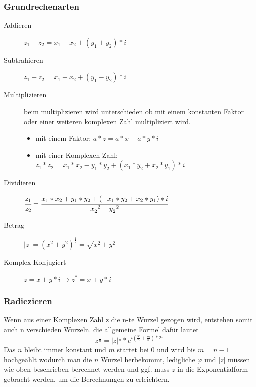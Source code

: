 \documentclass[a4paper]{scrartcl}
\begin{document}
            \subsubsection{Grundrechenarten}
                \begin{description}
                    \item[Addieren] $z_1 + z_2 = x_1 + x_2 + (y_1 + y_2)*i$ 
                    \item[Subtrahieren] $z_1 - z_2 = x_1 - x_2 + (y_1 - y_2)*i$ 
                    \item[Multiplizieren] beim multiplizieren wird unterschieden ob mit einem konstanten Faktor oder einer weiteren komplexen Zahl multipliziert wird.
                    \begin{itemize}
                        \item mit einem Faktor: $a * z = a * x + a * y * i $
                        \item mit einer Komplexen Zahl: $z_1 * z_2 = x_1 * x_2 - y_1 * y_2 + (x_1 * y_2 + x_2 * y_1) * i $
                    \end{itemize}  
                    \item[Dividieren]  $\cfrac{z_1}{z_2} = \cfrac{x_1*x_2 + y_1*y_2 + (-x_1*y_2 + x_2*y_1)*i}{x_2^{\;\;2} + y_2^{\;\;2}}$
                    \item[Betrag] $|z| = (x^2 + y^2)^\frac{1}{2} = \sqrt{x^2 + y^2}$ 
                    \item[Komplex Konjugiert] $z = x \pm y*i \rightarrow z^* = x \mp y*i$ 
                \end{description}
                
            \subsubsection{Radiezieren}
            Wenn aus einer Komplexen Zahl z die n-te Wurzel gezogen wird, entstehen somit auch n verschieden Wurzeln.
            die allgemeine Formel dafür lautet 
            \begin{equation*}
                z^{\frac{1}{n}} = |z|^{\frac{1}{n}} * e^{i(\frac{\varphi}{n} + \frac{m}{n})* 2\pi}
            \end{equation*}
            Das $n$ bleibt immer konstant und $m$ startet bei 0 und wird bis $m = n-1$ hochgeählt wodurch man die $n$ Wurzel herbekommt,
            ledigliche $\varphi$ und $|z|$ müssen wie oben beschrieben berechnet werden und ggf. muss $z$ in die Exponentialform gebracht werden, um die Berechnungen zu erleichtern.  
        \newpage
\end{document}
